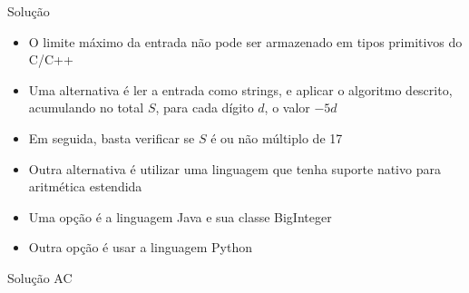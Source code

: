 \begin{frame}[fragile]{Solução}

    \begin{itemize}
        \item O limite máximo da entrada não pode ser armazenado em tipos primitivos do C/C++

        \item Uma alternativa é ler a entrada como strings, e aplicar o algoritmo descrito,
            acumulando no total $S$, para cada dígito $d$, o valor $-5d$

        \item Em seguida, basta verificar se $S$ é ou não múltiplo de 17

        \item Outra alternativa é utilizar uma linguagem que tenha suporte nativo para 
            aritmética estendida 

        \item Uma opção é a linguagem Java e sua classe BigInteger

        \item Outra opção é usar a linguagem Python

   \end{itemize}

\end{frame}

\begin{frame}[fragile]{Solução AC}
\end{frame}
